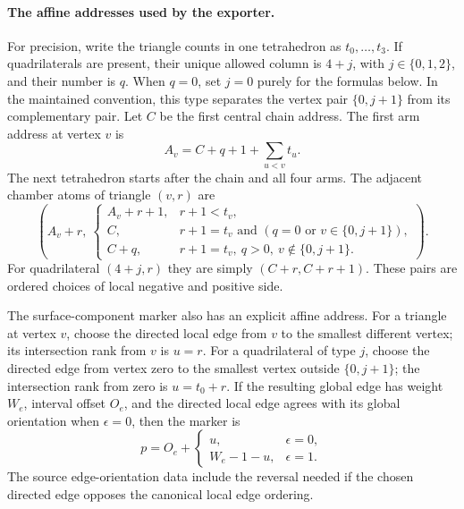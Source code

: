 \paragraph{The affine addresses used by the exporter.}
For precision, write the triangle counts in one tetrahedron as
$t_0,\ldots,t_3$. If quadrilaterals are present, their unique allowed
column is $4+j$, with $j\in\{0,1,2\}$, and their number is $q$.
When $q=0$, set $j=0$ purely for the formulas below.
In the maintained convention, this type separates the vertex pair
$\{0,j+1\}$ from its complementary pair. Let $C$ be the first central
chain address. The first arm address at vertex $v$ is
\[
 A_v=C+q+1+\sum_{u<v}t_u.
\]
The next tetrahedron starts after the chain and all four arms.
The adjacent chamber atoms of triangle $(v,r)$ are
\[
 \left(A_v+r,\
 \begin{cases}
 A_v+r+1,&r+1<t_v,\\
 C,&r+1=t_v\text{ and }(q=0\text{ or }v\in\{0,j+1\}),\\
 C+q,&r+1=t_v,\ q>0,\ v\notin\{0,j+1\}.
 \end{cases}\right).
\]
For quadrilateral $(4+j,r)$ they are simply $(C+r,C+r+1)$.
These pairs are ordered choices of local negative and positive side.

The surface-component marker also has an explicit affine address.
For a triangle at vertex $v$, choose the directed local edge from $v$
to the smallest different vertex; its intersection rank from $v$ is
$u=r$. For a quadrilateral of type $j$, choose the directed edge from
vertex zero to the smallest vertex outside $\{0,j+1\}$; the intersection
rank from zero is $u=t_0+r$. If the resulting global edge has weight
$W_e$, interval offset $O_e$, and the directed local edge agrees with
its global orientation when $\epsilon=0$, then the marker is
\[
 p=O_e+
 \begin{cases}
 u,&\epsilon=0,\\
 W_e-1-u,&\epsilon=1.
 \end{cases}
\]
The source edge-orientation data include the reversal needed if the
chosen directed edge opposes the canonical local edge ordering.

